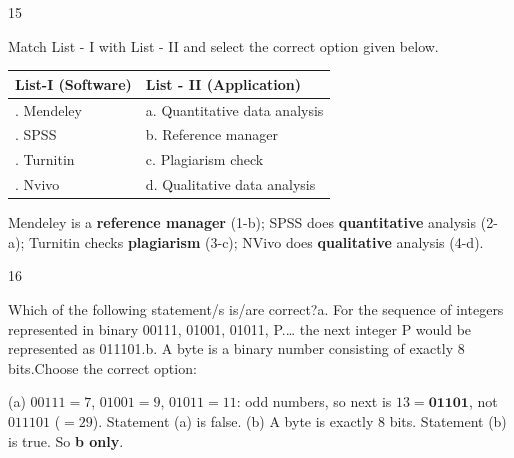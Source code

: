 \begin{question}{15}
{Match List - I with List - II and select the correct option given below.\par\smallskip\begin{tabularx}{\linewidth}{@{}>{\raggedright\arraybackslash}X>{\raggedright\arraybackslash}X@{}}\toprule
\textbf{List-I (Software)} & \textbf{List - II (Application)}\\\midrule
1. Mendeley & a. Quantitative data analysis\\
2. SPSS & b. Reference manager\\
3. Turnitin & c. Plagiarism check\\
4. Nvivo & d. Qualitative data analysis\\
\bottomrule\end{tabularx}\par\smallskip
\par}
\begin{explain}
Mendeley is a \textbf{reference manager} (1-b); SPSS does \textbf{quantitative} analysis (2-a); Turnitin checks \textbf{plagiarism} (3-c); NVivo does \textbf{qualitative} analysis (4-d).
\end{explain}
\end{question}

\begin{question}{16}
{Which of the following statement/s is/are correct?\newline a. For the sequence of integers represented in binary 00111, 01001, 01011, P.\ldots{} the next integer P would be represented as 011101.\newline b. A byte is a binary number consisting of exactly 8 bits.\newline Choose the correct option:\par}
\begin{explain}
(a) $00111=7$, $01001=9$, $01011=11$: odd numbers, so next is $13=\mathbf{01101}$, not $011101$ ($=29$). Statement (a) is false.
(b) A byte is exactly 8 bits. Statement (b) is true. So \textbf{b only}.
\end{explain}
\end{question}

